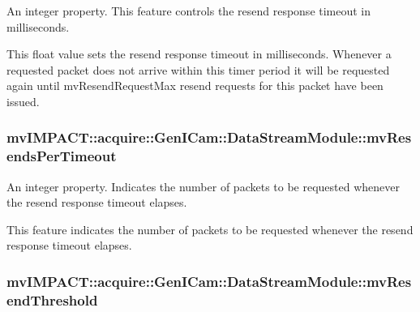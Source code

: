 An integer property. This feature controls the resend response timeout in milliseconds. 

This float value sets the resend response timeout in milliseconds. Whenever a requested packet does not arrive within this timer period it will be requested again until mv\+Resend\+Request\+Max resend requests for this packet have been issued. \hypertarget{classmv_i_m_p_a_c_t_1_1acquire_1_1_gen_i_cam_1_1_data_stream_module_a55cb9733b226b2dd8608573f0f9c16f1}{
\subsubsection[{mv\+Resends\+Per\+Timeout}]{ mv\+I\+M\+P\+A\+C\+T\+::acquire\+::\+Gen\+I\+Cam\+::\+Data\+Stream\+Module\+::mv\+Resends\+Per\+Timeout}}\label{classmv_i_m_p_a_c_t_1_1acquire_1_1_gen_i_cam_1_1_data_stream_module_a55cb9733b226b2dd8608573f0f9c16f1}


An integer property. Indicates the number of packets to be requested whenever the resend response timeout elapses. 

This feature indicates the number of packets to be requested whenever the resend response timeout elapses. \hypertarget{classmv_i_m_p_a_c_t_1_1acquire_1_1_gen_i_cam_1_1_data_stream_module_af464f44e350a2ca19f84dcc19b6f05b8}{
\subsubsection[{mv\+Resend\+Threshold}]{ mv\+I\+M\+P\+A\+C\+T\+::acquire\+::\+Gen\+I\+Cam\+::\+Data\+Stream\+Module\+::mv\+Resend\+Threshold}}\label{classmv_i_m_p_a_c_t_1_1acquire_1_1_gen_i_cam_1_1_data_stream_module_af464f44e350a2ca19f84dcc19b6f05b8}


